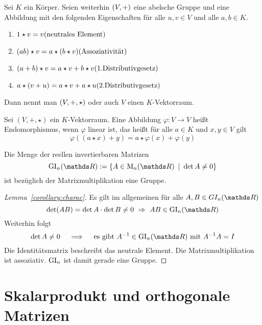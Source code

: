 		\begin{definition}[Vektorraum]
			Sei $K$ ein Körper. 
			Seien weiterhin $\left( V,+ \right)$ eine abelsche Gruppe und  eine Abbildung mit den folgenden Eigenschaften für alle $u,v\in V$ und alle $a,b\in K$.
			\begin{enumerate}[label = \normalfont{(V\arabic*)}]
				\item $ 1\star v = v \hfill\text{(neutrales Element)} $
				\item $ (ab)\star v = a\star(b\star v) \hfill\text{(Assoziativität)} $
				\item $ (a+b)\star v = a\star v + b\star v \hfill\text{(1.Distributivgesetz)} $
				\item $ a\star (v+u) = a\star v + a\star u \hfill\text{(2.Distributivgesetz)} $
			\end{enumerate}
			Dann nennt man $\left( V,+,\star \right)$ oder auch $V$ einen $K$-Vektorraum.
		\end{definition}

		\begin{definition}[Vektorraumendomorphismus]
			Sei $(V,+,\star)$ ein $K$-Vektorraum.
			Eine Abbildung $\varphi:V\longrightarrow V$ heißt Endomorphismus, wenn $\varphi$ linear ist, das heißt für alle $a\in K$ und $x,y\in V$ gilt
			\[
				\varphi((a\star x)+y) = a\star\varphi(x) + \varphi(y)
			\]
		\end{definition}

		\begin{lemma}
			Die Menge der reellen invertierbaren Matrizen
			\[
				\m{GI}_n(\SR) := \set{A\in \m{M}_n(\SR)}{\det A \neq 0}
			\]
			ist bezüglich der Matrixmultiplikation eine Gruppe.
		\end{lemma}
		\begin{proof}[Lemma\ \ref{corollary:charac}]
			Es gilt im allgemeinen für alle $A,B\in GI_n(\SR)$
			\[
				\det(AB) = \det A \cdot\det B \neq 0 \ \Rightarrow \ AB\in \m{GI}_n(\SR)
			\]
			Weiterhin folgt
			\[
				\det A \neq 0 \quad \implies \quad \text{es gibt } A^{-1}\in \m{GI}_n(\SR) \text{ mit } A^{-1}A=I
			\]
			Die Identitätsmatrix beschreibt das neutrale Element.
			Die Matrixmultiplikation ist assoziativ.
			$\mathrm{GI}_n$ ist damit gerade eine Gruppe.
		\end{proof}

	
	\section{Skalarprodukt und orthogonale Matrizen} %
	\label{sub:skalarprodukt_und_orthogonale_matrizen}
	
